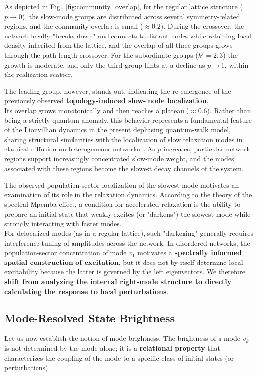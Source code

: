 \documentclass[pdflatex,sn-mathphys-num]{sn-jnl}
\let\origtextcolor\textcolor
\newcommand{\rev}[1]{{\origtextcolor{revred}{#1}}}
\renewcommand{\textcolor}[2]{#2}
\begin{document}
As depicted in Fig.~\ref{fig:community_overlap}, for the regular lattice structure ($p \to 0$), the slow-mode groups are distributed across several symmetry-related regions, and the community overlap is small (${\approx}0.2$). During the crossover, the network locally "breaks down" and connects to distant nodes while retaining local density inherited from the lattice, and the overlap of all three groups grows through the path-length crossover. For the subordinate groups ($k'=2, 3$) the growth is moderate, and only the third group hints at a decline as $p \to 1$, within the realization scatter.\

The leading group, however, stands out, indicating the re-emergence of the previously observed \textbf{topology-induced slow-mode localization}.\\
Its overlap grows monotonically and then reaches a plateau (${\approx}0.6$). Rather than being a strictly quantum anomaly, this behavior represents a fundamental feature of the Liouvillian dynamics in the present dephasing quantum-walk model, sharing structural similarities with the localization of slow relaxation modes in classical diffusion on heterogeneous networks~\rev{\cite{Hata2017,Mulken2011}}. As $p$ increases, particular network regions support increasingly concentrated slow-mode weight, and the modes associated with these regions become the slowest decay channels of the system.

The observed population-sector localization of the slowest mode motivates an examination of its role in the relaxation dynamics. According to the theory of the spectral Mpemba effect, a condition for accelerated relaxation is the ability to prepare an initial state that weakly excites (or "darkens") the slowest mode while strongly interacting with faster modes.\\

For delocalized modes (as in a regular lattice), such "darkening" generally requires interference tuning of amplitudes across the network. In disordered networks, the population-sector concentration of mode $v_1$ motivates a \textbf{spectrally informed spatial construction of excitation}, but it does not by itself determine local excitability because the latter is governed by the left eigenvectors. We therefore \textbf{shift from analyzing the internal right-mode structure to directly calculating the response to local perturbations}.

\subsection{Mode-Resolved State Brightness}
Let us now establish the notion of mode brightness. The brightness of a mode $v_k$ is not determined by the mode alone; it is a \textbf{relational property} that characterizes the coupling of the mode to a specific class of initial states (or perturbations).
\end{document}
